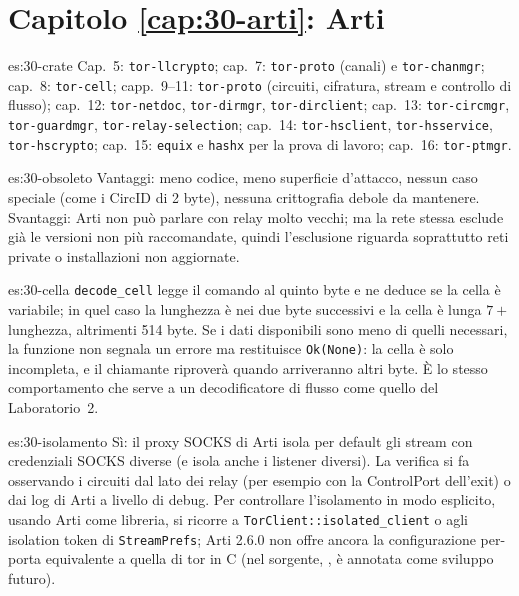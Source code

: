 \section*{Capitolo \ref{cap:30-arti}: Arti}

\begin{soluzione}{es:30-crate}
Cap.~5: \texttt{tor-llcrypto}; cap.~7: \texttt{tor-proto} (canali) e \texttt{tor-chanmgr}; cap.~8: \texttt{tor-cell}; capp.~9--11: \texttt{tor-proto} (circuiti, cifratura, stream e controllo di flusso); cap.~12: \texttt{tor-netdoc}, \texttt{tor-dirmgr}, \texttt{tor-dirclient}; cap.~13: \texttt{tor-circmgr}, \texttt{tor-guardmgr}, \texttt{tor-relay-selection}; cap.~14: \texttt{tor-hsclient}, \texttt{tor-hsservice}, \texttt{tor-hscrypto}; cap.~15: \texttt{equix} e \texttt{hashx} per la prova di lavoro; cap.~16: \texttt{tor-ptmgr}.
\end{soluzione}

\begin{soluzione}{es:30-obsoleto}
Vantaggi: meno codice, meno superficie d'attacco, nessun caso speciale (come i CircID di 2 byte), nessuna crittografia debole da mantenere. Svantaggi: Arti non può parlare con relay molto vecchi; ma la rete stessa esclude già le versioni non più raccomandate, quindi l'esclusione riguarda soprattutto reti private o installazioni non aggiornate.
\end{soluzione}

\begin{soluzione}{es:30-cella}
\texttt{decode\_cell} legge il comando al quinto byte e ne deduce se la cella è variabile; in quel caso la lunghezza è nei due byte successivi e la cella è lunga $7 +$ lunghezza, altrimenti 514 byte. Se i dati disponibili sono meno di quelli necessari, la funzione non segnala un errore ma restituisce \texttt{Ok(None)}: la cella è solo incompleta, e il chiamante riproverà quando arriveranno altri byte. È lo stesso comportamento che serve a un decodificatore di flusso come quello del Laboratorio~2.
\end{soluzione}

\begin{soluzione}{es:30-isolamento}
Sì: il proxy SOCKS di Arti isola per default gli stream con credenziali SOCKS diverse (e isola anche i listener diversi). La verifica si fa osservando i circuiti dal lato dei relay (per esempio con la ControlPort dell'exit) o dai log di Arti a livello di debug. Per controllare l'isolamento in modo esplicito, usando Arti come libreria, si ricorre a \texttt{TorClient::isolated\_client} o agli isolation token di \texttt{StreamPrefs}; Arti 2.6.0 non offre ancora la configurazione per-porta equivalente a quella di tor in C (nel sorgente, , è annotata come sviluppo futuro).
\end{soluzione}

